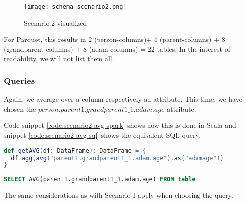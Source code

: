 \begin{figure}[h]
\centering
\texttt{[image: schema-scenario2.png]}
\caption{Scenario 2 visualized}
\label{fig:schema-scenario2}
\end{figure}

For Parquet, this results in 2 (person-columns)+ 4 (parent-columns) + 8 (grandparent-columns) + 8 (adam-columns) = 22 tables.
In the interest of readability, we will not list them all.
\subsubsection{Queries}
\label{sec:query-two}
Again, we average over a column respectively an attribute. This time, we have chosen the $person.parent1.grandparent1\_1.adam.age$ attribute.

Code-snippet \ref{code:scenario2-avg-spark} shows how this is done in Scala and snippet \ref{code:scenario2-avg-sql} shows the equivalent SQL query.

\begin{minipage}{\linewidth}
\begin{lstlisting}[language=Scala,caption=Average over the ID Column in Spark, label=code:scenario2-avg-spark]
def getAVG(df: DataFrame): DataFrame = {
  df.agg(avg("parent1.grandparent1_1.adam.age").as("adamage"))
}
\end{lstlisting}
\end{minipage}

\begin{minipage}{\linewidth}
\begin{lstlisting}[language=SQL,caption=Equivalent SQL Query, label=code:scenario2-avg-sql]
  SELECT AVG(parent1.grandparent1_1.adam.age) FROM table;
\end{lstlisting}
\end{minipage}

The same considerations as with Scenario I apply when choosing the query.
\newpage